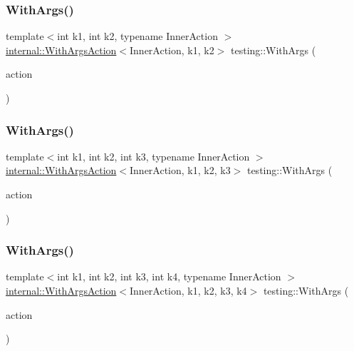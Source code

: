 \mbox{\label{namespacetesting_aa82fc09250ba172220e6fb7e77249e74}} 
\subsubsection{\texorpdfstring{WithArgs()}{WithArgs()}\hspace{0.1cm}{\footnotesize\ttfamily [2/10]}}
{\footnotesize\ttfamily template$<$int k1, int k2, typename Inner\+Action $>$ \\
\mbox{\hyperlink{classtesting_1_1internal_1_1WithArgsAction}{internal\+::\+With\+Args\+Action}}$<$Inner\+Action, k1, k2$>$ testing\+::\+With\+Args (\begin{DoxyParamCaption}\item[{const Inner\+Action \&}]{action }\end{DoxyParamCaption})\hspace{0.3cm}{\ttfamily [inline]}}

\mbox{\label{namespacetesting_a999614cb785165b9a44a9a95a3753407}} 
\subsubsection{\texorpdfstring{WithArgs()}{WithArgs()}\hspace{0.1cm}{\footnotesize\ttfamily [3/10]}}
{\footnotesize\ttfamily template$<$int k1, int k2, int k3, typename Inner\+Action $>$ \\
\mbox{\hyperlink{classtesting_1_1internal_1_1WithArgsAction}{internal\+::\+With\+Args\+Action}}$<$Inner\+Action, k1, k2, k3$>$ testing\+::\+With\+Args (\begin{DoxyParamCaption}\item[{const Inner\+Action \&}]{action }\end{DoxyParamCaption})\hspace{0.3cm}{\ttfamily [inline]}}

\mbox{\label{namespacetesting_a646a2e4ac7866ee8c486cb167ba9b45e}} 
\subsubsection{\texorpdfstring{WithArgs()}{WithArgs()}\hspace{0.1cm}{\footnotesize\ttfamily [4/10]}}
{\footnotesize\ttfamily template$<$int k1, int k2, int k3, int k4, typename Inner\+Action $>$ \\
\mbox{\hyperlink{classtesting_1_1internal_1_1WithArgsAction}{internal\+::\+With\+Args\+Action}}$<$Inner\+Action, k1, k2, k3, k4$>$ testing\+::\+With\+Args (\begin{DoxyParamCaption}\item[{const Inner\+Action \&}]{action }\end{DoxyParamCaption})\hspace{0.3cm}{\ttfamily [inline]}}

